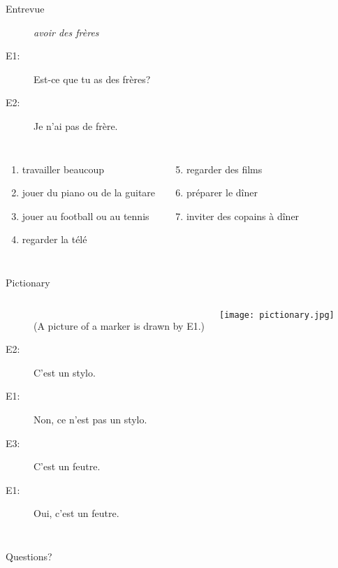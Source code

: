 \documentclass{beamer}
\begin{document}
  \begin{frame}{Entrevue}
     \\
    \begin{description}
      \item[] \emph{avoir des frères}
      \item[E1:] Est-ce que tu as des frères?
      \item[E2:] Je n'ai pas de frère.
    \end{description}
    \begin{columns}
        \begin{enumerate}
          \item travailler beaucoup
          \item jouer du piano ou de la guitare
          \item jouer au football ou au tennis
          \item regarder la télé
        \end{enumerate}
        \begin{enumerate}
          \setcounter{enumi}{4}
          \item regarder des films
          \item préparer le dîner
          \item inviter des copains à dîner
        \end{enumerate}
    \end{columns}
  \end{frame}

  \begin{frame}{Pictionary}
    \begin{columns}
        \begin{description}
          \item[] (A picture of a marker is drawn by E1.)
          \item[E2:] C'est un stylo.
          \item[E1:] Non, ce n'est pas un stylo.
          \item[E3:] C'est un feutre.
          \item[E1:] Oui, c'est un feutre.
        \end{description}
        \begin{center}
          \texttt{[image: pictionary.jpg]}
        \end{center}
    \end{columns}
  \end{frame}

  \begin{frame}{}
    \begin{center}
      \Large Questions?
    \end{center}
  \end{frame}
\end{document}
